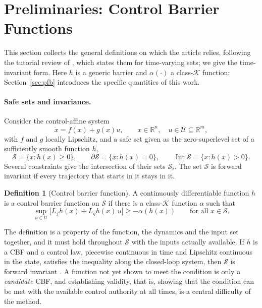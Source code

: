 \documentclass[11pt]{article}
\theoremstyle{definition}
\newtheorem{definition}{Definition}
\begin{document}
\section{Preliminaries: Control Barrier Functions}\label{sec:prelim}

This section collects the general definitions on which the article relies, following the tutorial review of
\citet{garg2024advances}, which states them for time-varying sets; we give the time-invariant form. Here $h$ is a
generic barrier and $\alpha(\cdot)$ a class-$\mathcal{K}$ function; Section~\ref{sec:pfb} introduces the specific
quantities of this work.

\paragraph{Safe sets and invariance.} Consider the control-affine system
\begin{equation}
\dot x=f(x)+g(x)u,\qquad x\in\mathbb{R}^n,\quad u\in\mathcal{U}\subseteq\mathbb{R}^m,
\label{eq:affine}
\end{equation}
with $f$ and $g$ locally Lipschitz, and a safe set given as the zero-superlevel set of a sufficiently smooth function $h$,
\begin{equation}
\mathcal{S}=\{x:h(x)\ge0\},\qquad\partial\mathcal{S}=\{x:h(x)=0\},\qquad\operatorname{Int}\mathcal{S}=\{x:h(x)>0\}.
\label{eq:safeset}
\end{equation}
Several constraints give the intersection of their sets $\mathcal{S}_i$. The set $\mathcal{S}$ is forward invariant if
every trajectory that starts in it stays in it.

\begin{definition}[Control barrier function]\label{def:cbf}
A continuously differentiable function $h$ is a control barrier function on $\mathcal{S}$ if there is a class-$\mathcal{K}$
function $\alpha$ such that
\begin{equation}
\sup_{u\in\mathcal{U}}\big[L_fh(x)+L_gh(x)\,u\big]\ge-\alpha(h(x))\qquad\text{for all }x\in\mathcal{S}.
\label{eq:cbfcond}
\end{equation}
\end{definition}

The definition is a property of the function, the dynamics and the input set together, and it must hold throughout
$\mathcal{S}$ with the inputs actually available. If $h$ is a CBF and a control law, piecewise continuous in time and
Lipschitz continuous in the state, satisfies the inequality along the closed-loop system, then $\mathcal{S}$ is forward
invariant \citep{ames2017cbfqp,garg2024advances}. A function not yet shown to meet the condition is only a
\emph{candidate} CBF, and establishing validity, that is, showing that the condition can be met with the available
control authority at all times, is a central difficulty of the method.
\end{document}
